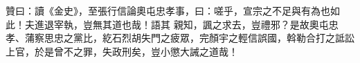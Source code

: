 \begin{pinyinscope}
 贊曰：讀《金史》，至張行信論奧屯忠孝事，曰：嗟乎，宣宗之不足與有為也如此！夫進退宰執，豈無其道也哉！語其
 親知，諷之求去，豈禮邪？是故奧屯忠孝、蒲察思忠之黨比，紇石烈胡失門之疲眾，完顏宇之輕信誤國，斡勒合打之詆訟上官，於是曾不之罪，失政刑矣，豈小懲大誡之道哉！



\end{pinyinscope}